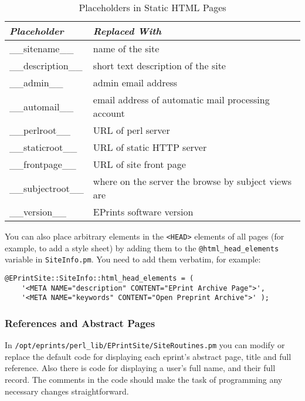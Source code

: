 \begin{table}
\begin{center}
\begin{tabular}{|l|l|}
\hline
\emph{Placeholder}  & \emph{Replaced With}                                \\
\hline 
\_\_sitename\_\_    & name of the site                                    \\
\_\_description\_\_ & short text description of the site                  \\
\_\_admin\_\_       & admin email address                                 \\
\_\_automail\_\_    & email address of automatic mail processing account  \\
\_\_perlroot\_\_    & URL of perl server                                  \\
\_\_staticroot\_\_  & URL of static HTTP server                           \\
\_\_frontpage\_\_   & URL of site front page                              \\
\_\_subjectroot\_\_ & where on the server the browse by subject views are \\
\_\_version\_\_     & EPrints software version                            \\
\hline
\end{tabular}
\caption{\label{install_placeholders} Placeholders in Static HTML Pages}
\end{center}
\end{table}

You can also place arbitrary elements in the {\tt <HEAD>} elements of all pages (for example, to add a style sheet) by adding them to the {\tt @html\_head\_elements} variable in {\tt SiteInfo.pm}. You need to add them verbatim, for example:

\begin{verbatim}
@EPrintSite::SiteInfo::html_head_elements = (
	'<META NAME="description" CONTENT="EPrint Archive Page">',
	'<META NAME="keywords" CONTENT="Open Preprint Archive">' );
\end{verbatim}


\subsubsection{References and Abstract Pages}

In {\tt /opt/eprints/perl\_lib/EPrintSite/SiteRoutines.pm} you can modify or replace the default code for displaying each eprint's abstract page, title and full reference. Also there is code for displaying a user's full name, and their full record. The comments in the code should make the task of programming any necessary changes straightforward.

